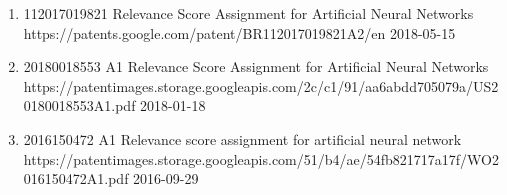 {{\begin{enumerate}
                \item [] 
                                {112017019821}
                                {Relevance Score Assignment for Artificial Neural Networks }
                                {https://patents.google.com/patent/BR112017019821A2/en}
                                {2018-05-15}

                \item [] 
                                {20180018553 A1}
                                {Relevance Score Assignment for Artificial Neural Networks }
                                {https://patentimages.storage.googleapis.com/2c/c1/91/aa6abdd705079a/US20180018553A1.pdf}
                                {2018-01-18}  
                                
                \item[] 
                                    {2016150472 A1}
                                    {Relevance score assignment for artificial neural network}
                                    {https://patentimages.storage.googleapis.com/51/b4/ae/54fb821717a17f/WO2016150472A1.pdf}
                                    {2016-09-29}
            \end{enumerate}
        }
    \fi
}

